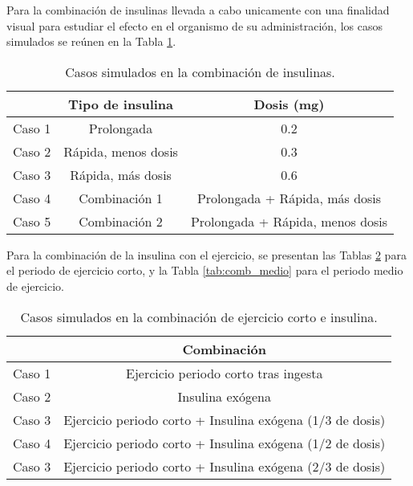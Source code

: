 Para la combinación de insulinas llevada a cabo unicamente con una finalidad visual para estudiar el efecto en el organismo de su administración, los casos simulados se reúnen en la Tabla \ref{tab:insulinas}.
\clearpage
\begin{table}[htbp]
    \centering
    \caption{Casos simulados en la combinación de insulinas.}
    \begin{tabular}{|c|c|c|}
        \hline
          & Tipo de insulina & Dosis (mg)  \\
        \hline
        Caso 1 & Prolongada & 0.2  \\
        Caso 2 & Rápida, menos dosis & 0.3  \\
        Caso 3 & Rápida, más dosis & 0.6  \\
        Caso 4 & Combinación 1 & Prolongada + Rápida, más dosis \\
        Caso 5 & Combinación 2 & Prolongada + Rápida, menos dosis \\
        \hline
    \end{tabular}
    \label{tab:insulinas}
\end{table}

Para la combinación de la insulina con el ejercicio, se presentan las Tablas \ref{tab:comb_corto} para el periodo de ejercicio corto, y la Tabla \ref{tab:comb_medio} para el periodo medio de ejercicio.

\begin{table}[htbp]
    \centering
    \caption{Casos simulados en la combinación de ejercicio corto e insulina.}
    \begin{tabular}{|c|c|}
        \hline
         & Combinación \\
        \hline
        Caso 1 & Ejercicio periodo corto tras ingesta \\
        Caso 2 & Insulina exógena\\
        Caso 3 & Ejercicio periodo corto + Insulina exógena (1/3 de dosis) \\
        Caso 4 & Ejercicio periodo corto + Insulina exógena (1/2 de dosis) \\
        Caso 3 & Ejercicio periodo corto + Insulina exógena (2/3 de dosis) \\
        \hline
    \end{tabular}
    \label{tab:comb_corto}
\end{table}

